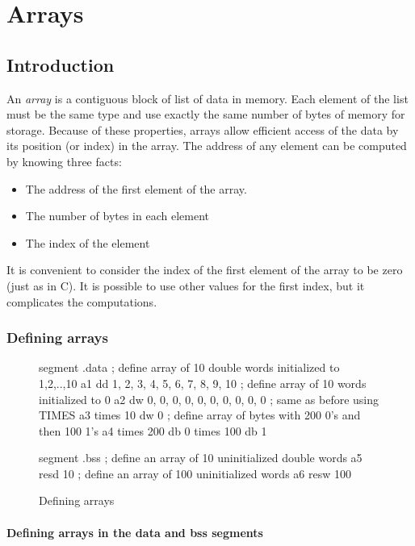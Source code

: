 \chapter{Arrays}
\section{Introduction}

An \emph{array} is a contiguous block of list of data in memory. Each element
of the list must be the same type and use exactly the same number of bytes
of memory for storage. Because of these properties, arrays allow efficient
access of the data by its position (or index) in the array. The address
of any element can be computed by knowing three facts:
\begin{itemize}
\item The address of the first element of the array.
\item The number of bytes in each element
\item The index of the element
\end{itemize}

It is convenient to consider the index of the first element of the array
to be zero (just as in C). It is possible to use other values for the
first index, but it complicates the computations.

\subsection{Defining arrays}

\begin{figure}[t]
\begin{AsmCodeListing}[frame=single]
segment .data
; define array of 10 double words initialized to 1,2,..,10
a1           dd   1, 2, 3, 4, 5, 6, 7, 8, 9, 10
; define array of 10 words initialized to 0
a2           dw   0, 0, 0, 0, 0, 0, 0, 0, 0, 0
; same as before using TIMES
a3           times 10 dw 0
; define array of bytes with 200 0's and then 100 1's
a4           times 200 db 0
             times 100 db 1

segment .bss
; define an array of 10 uninitialized double words
a5           resd  10
; define an array of 100 uninitialized words
a6           resw  100
\end{AsmCodeListing}
\caption{Defining arrays\label{fig:DataArrays}}
\end{figure}

\subsubsection{Defining arrays in the {\code data} and {\code bss} segments
               }

